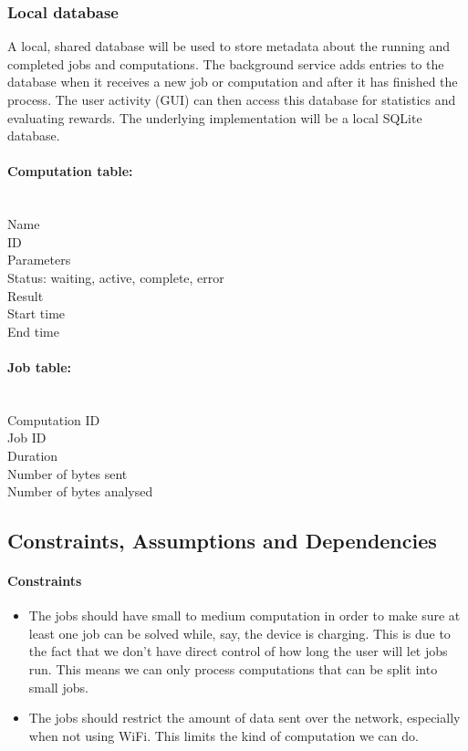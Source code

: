 \documentclass[a4paper,10pt]{article}
\begin{document}
\subsubsection{Local database}

A local, shared database will be used to store metadata about the running and completed jobs and computations. The background service adds entries to the database when it receives a new job or computation and after it has finished the process. The user activity (GUI) can then access this database for statistics and evaluating rewards. The underlying implementation will be a local SQLite database.

\begin{multicols}{2}
\paragraph{Computation table:} ~\\
\noindent Name\\
ID\\
Parameters\\
Status: waiting, active, complete, error\\
Result\\
Start time\\
End time

\paragraph{Job table:} ~\\
\noindent Computation ID\\
Job ID\\
Duration\\
Number of bytes sent\\
Number of bytes analysed\\
\end{multicols}


\subsection{Constraints, Assumptions and Dependencies}
\paragraph{Constraints}
\begin{itemize}
	\item The jobs should have small to medium computation in order to make sure at least one job can be solved while, say, the device is charging. This is due to the fact that we don't have direct control of how long the user will let jobs run. This means we can only process computations that can be split into small jobs.

	\item The jobs should restrict the amount of data sent over the network, especially when not using WiFi. This limits the kind of computation we can do.
\end{itemize} 
\end{document}

